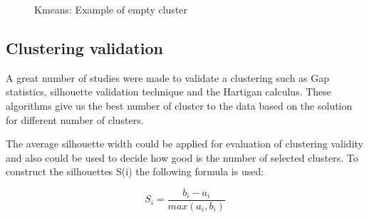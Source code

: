 \documentclass[a4paper,11pt]{article}
\begin{document}
\begin{figure}[ht!]
\begin{centering}
{      \label{fig:emptyb}
    }
  \end{centering}
  \caption{Kmeans: Example of empty cluster}
  \label{fig:empty}

\end{figure}
  
\subsection{Clustering validation}

A  great number  of  studies were  made to  validate  a clustering  such as  Gap
statistics, silhouette validation technique and the Hartigan calculus. These algorithms give us the best
number of cluster to the data based on the solution for different number of clusters.

 The  average silhouette  width could  be applied  for evaluation  of clustering
 validity and also  could be used to  decide how good is the  number of selected
 clusters. To construct the silhouettes S(i) the following formula is used:

\begin{equation}
S_i = \frac{b_i-a_i}{max(a_i,b_i)}
\end{equation}
\end{document}
